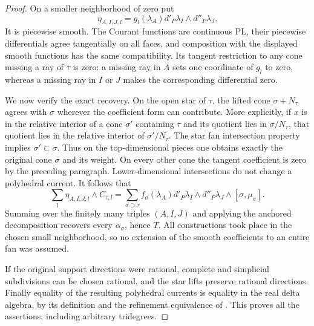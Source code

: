 \documentclass[11pt,a4paper]{article}
\numberwithin{equation}{section}
\theoremstyle{definition}
\theoremstyle{remark}
\begin{document}
\begin{proof}
On a smaller neighborhood of zero put
\[
                    \eta_{A,I,J,l}
                       =g_l(\lambda_A)
                             d'_P\lambda_I\wedge d''_P\lambda_J.
\]
It is piecewise smooth.  The Courant functions are continuous
PL, their piecewise differentials agree tangentially on all
faces, and composition with the displayed smooth functions
has the same compatibility.  Its tangent restriction to any
cone missing a ray of $\tau$ is zero: a missing ray in $A$
sets one coordinate of $g_l$ to zero, whereas a missing ray
in $I$ or $J$ makes the corresponding differential zero.

We now verify the exact recovery.  On the open star of $\tau$,
the lifted cone $\sigma+N_\tau$ agrees with $\sigma$ wherever
the coefficient form can contribute.  More explicitly, if
$x$ is in the relative interior of a cone $\sigma'$ containing
$\tau$ and its quotient lies in $\sigma/N_\tau$, that quotient
lies in the relative interior of $\sigma'/N_\tau$.
The star fan intersection property implies
$\sigma'\subset\sigma$.  Thus on the top-dimensional pieces
one obtains exactly the original cone $\sigma$ and its weight.
On every other cone the tangent coefficient is zero by the
preceding paragraph.  Lower-dimensional intersections do
not change a polyhedral current.  It follows that
\[
 \sum_l\eta_{A,I,J,l}\wedge C_{\tau,l}
      =\sum_{\sigma\supset\tau}
             f_\sigma(\lambda_A)
                    d'_P\lambda_I\wedge d''_P\lambda_J
                                \wedge[\sigma,\mu_\sigma].
\]
Summing over the finitely many triples $(A,I,J)$ and applying
the anchored decomposition recovers every $\alpha_\sigma$,
hence $T$.  All constructions took place in the chosen small
neighborhood, so no extension of the smooth coefficients to
an entire fan was assumed.

If the original support directions were rational, complete
and simplicial subdivisions can be chosen rational, and the
star lifts preserve rational directions.  Finally equality
of the resulting polyhedral currents is equality in the real
delta algebra, by its definition and the refinement
equivalence of \cite[Remark~2.3]{Mih23}.  This proves all the
assertions, including arbitrary tridegrees.
\end{proof}
\end{document}
